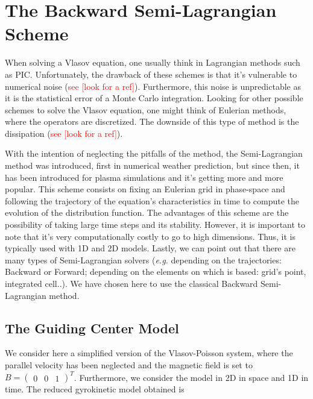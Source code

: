 \documentclass[proc]{edpsmath}
\begin{document}
\section{The Backward Semi-Lagrangian Scheme}
\label{sec:BSL_scheme}

When solving a Vlasov equation, one usually think in Lagrangian methods such as PIC. Unfortunately, the drawback of these schemes is that it's vulnerable to numerical noise (\textcolor{red}{see [look for a ref]}). Furthermore, this noise is unpredictable as it is the statistical error of a Monte Carlo integration. Looking for other possible schemes to solve the Vlasov equation, one might think of Eulerian methods, where the operators 
are discretized. The downside of this type of method is the dissipation (\textcolor{red}{see [look for a ref]}).

With the intention of neglecting the pitfalls of the method, the Semi-Lagrangian method was introduced, first in numerical weather prediction, but since then, it has been introduced for plasma simulations \cite{sonnendrucker:inria-00073296, Cheng1976330} and it's getting more and more popular. This scheme consists on fixing an Eulerian grid in phase-space and following the trajectory of the equation's characteristics in time to compute the evolution of the distribution function. The advantages of this scheme are the possibility of taking large time steps and its stability. However, it is important to note that it's very computationally costly to go to high dimensions. Thus, it is typically used with 1D and 2D models. Lastly, we can point out that there are many types of Semi-Lagrangian solvers (\emph{e.g.} depending on the trajectories: Backward or Forward;  depending on the elements on which is based: grid's point, integrated cell..). We have chosen here to use the classical Backward Semi-Lagrangian method. 

\subsection{The Guiding Center Model}
We consider here a simplified version of the Vlasov-Poisson system, where the parallel velocity has been neglected and the magnetic field is set to $B = \begin{pmatrix} 0 & 0 & 1 \end{pmatrix}^T$. Furthermore, we consider the model in 2D in space and 1D in time. The reduced gyrokinetic model obtained is
\end{document}

